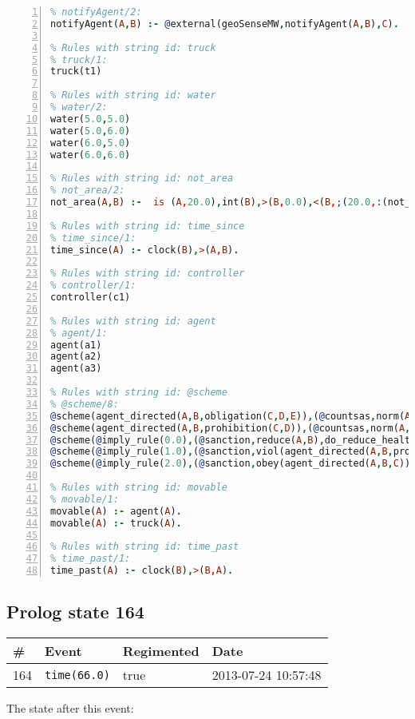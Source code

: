 \documentclass[11pt]{article}\usepackage[utf8]{inputenc}\usepackage{geometry}
\begin{document}
\begin{lstlisting}[language=Prolog, numbers=left]
% Rules with string id: notifyAgent
% notifyAgent/2:
notifyAgent(A,B) :- @external(geoSenseMW,notifyAgent(A,B),C).

% Rules with string id: truck
% truck/1:
truck(t1)

% Rules with string id: water
% water/2:
water(5.0,5.0)
water(5.0,6.0)
water(6.0,5.0)
water(6.0,6.0)

% Rules with string id: not_area
% not_area/2:
not_area(A,B) :-  is (A,20.0),int(B),>(B,0.0),<(B,;(20.0,:(not_area(A,B), is (-(B),20.0)))),int(A),>(A,0.0),<(A,;(20.0,:(area(A,B),-(int(A))))),int(B),>(A,0.0),>(B,0.0),<(A,21.0),<(B,21.0).

% Rules with string id: time_since
% time_since/1:
time_since(A) :- clock(B),>(A,B).

% Rules with string id: controller
% controller/1:
controller(c1)

% Rules with string id: agent
% agent/1:
agent(a1)
agent(a2)
agent(a3)

% Rules with string id: @scheme
% @scheme/8:
@scheme(agent_directed(A,B,obligation(C,D,E)),(@countsas,norm(A,B,F,obligation(C,D,E)),F),false,(listTrue(C)),(time_past(D)),false,[plus(viol(agent_directed(A,B,obligation(C,D,E))))|[]],[plus(obey(agent_directed(A,B,obligation(C,D,E))))|[]])
@scheme(agent_directed(A,B,prohibition(C,D)),(@countsas,norm(A,B,E,prohibition(C,D)),E),(listTrue(C)),false,(false),false,[plus(viol(agent_directed(A,B,prohibition(C,D))))|[]],[plus(obey(agent_directed(A,B,prohibition(C,D))))|[]])
@scheme(@imply_rule(0.0),(@sanction,reduce(A,B),do_reduce_health(A,B),notifyAgent(A,changed(status))),true,false,false,false,[min(reduce(A,B))|[]],[])
@scheme(@imply_rule(1.0),(@sanction,viol(agent_directed(A,B,prohibition(C,D))),do_sanction(D)),true,false,false,false,[min(viol(agent_directed(A,B,prohibition(C,D))))|[]],[])
@scheme(@imply_rule(2.0),(@sanction,obey(agent_directed(A,B,C))),true,false,false,false,[min(obey(agent_directed(A,B,C)))|[]],[])

% Rules with string id: movable
% movable/1:
movable(A) :- agent(A).
movable(A) :- truck(A).

% Rules with string id: time_past
% time_past/1:
time_past(A) :- clock(B),>(B,A).

\end{lstlisting}
\clearpage 
\subsection{Prolog state 164}
\begin{table}[ht]
\centering 
\begin{tabular}{l l l l} 
\textbf{\#} & \textbf{Event} & \textbf{Regimented} & \textbf{Date} \\ [0.5ex] 
\hline
164&\texttt{time(66.0)}&true&2013-07-24 10:57:48\\ [1ex] \hline\end{tabular}
\end{table}
The state after this event:
\end{document}
